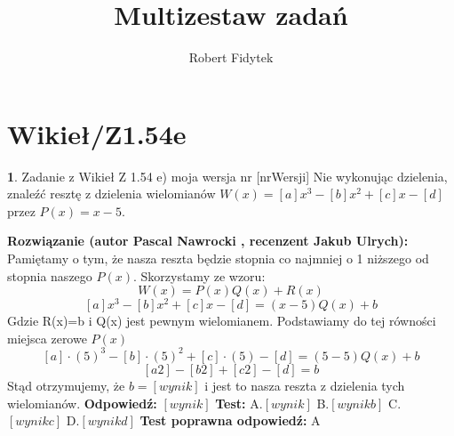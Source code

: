 \documentclass[12pt, a4paper]{article}
\title{Multizestaw zadań}
\author{Robert Fidytek}
\date{}
\theoremstyle{definition} %
\newtheorem{zad}{}
\newcommand{\kategoria}[1]{\section{#1}} %
\newcommand{\zadStart}[1]{\begin{zad}#1\newline} %
\newcommand{\zadStop}{\end{zad}}   %
\newcommand{\rozwStart}[2]{\noindent \textbf{Rozwiązanie (autor #1 , recenzent #2): }\newline} %
\newcommand{\odpStart}{\noindent \textbf{Odpowiedź:}\newline}    %
\newcommand{\odpStop}{\newline}                                             %
\newcommand{\testStart}{\noindent \textbf{Test:}\newline} %
\newcommand{\testStop}{\newline} %
\newcommand{\kluczStart}{\noindent \textbf{Test poprawna odpowiedź:}\newline} %
\newcommand{\kluczStop}{\newline} %
\begin{document}
\maketitle
\kategoria{Wikieł/Z1.54e}
\zadStart{Zadanie z Wikieł Z 1.54 e) moja wersja nr [nrWersji]}
Nie wykonując dzielenia, znaleźć resztę z dzielenia wielomianów $W(x)=[a]x^3-[b]x^2+[c]x-[d]$ przez $P(x)=x-5$.
\zadStop
\rozwStart{Pascal Nawrocki}{Jakub Ulrych}
Pamiętamy o tym, że nasza reszta będzie stopnia co najmniej o 1 niższego od stopnia naszego $P(x)$. Skorzystamy ze wzoru:
$$W(x)=P(x)Q(x)+R(x)$$
$$[a]x^3-[b]x^2+[c]x-[d]=(x-5)Q(x)+b$$
Gdzie R(x)=b i Q(x) jest pewnym wielomianem. Podstawiamy do tej równości miejsca zerowe $P(x)$
$$[a]\cdot(5)^3-[b]\cdot(5)^2+[c]\cdot(5)-[d]=(5-5)Q(x)+b$$
$$[a2]-[b2]+[c2]-[d]=b$$
Stąd otrzymujemy, że $b=[wynik]$ i jest to nasza reszta z dzielenia tych wielomianów.
\odpStart
$[wynik]$
\odpStop
\testStart
A.$[wynik]$
B.$[wynikb]$
C.$[wynikc]$
D.$[wynikd]$
\testStop
\kluczStart
A
\kluczStop
\end{document}
